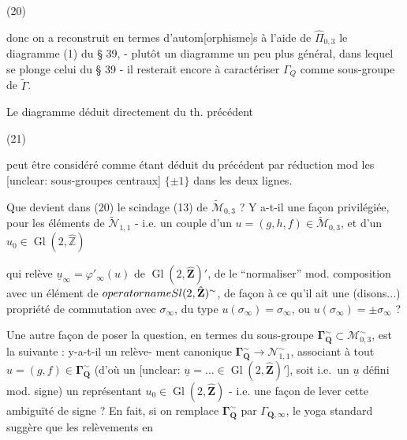 \begin{enumerate}
(20)

\newpage


donc on a reconstruit en termes d'autom[orphisme]s
à l'aide de $\hat{\Pi}_{0,3}$ le diagramme (1) du
§ 39, - plutôt un diagramme un
peu plus général, dans lequel se plonge
celui du § 39 - il resterait encore à
caractériser $\Gamma_Q$ comme sous-groupe de $\tilde{\Gamma}$.

Le diagramme déduit directement du
th. précédent

(21)

peut être considéré comme étant déduit
du précédent par réduction mod les
[unclear: sous-groupes centraux] $\{\pm 1\}$ dans les deux lignes.

Que devient dans (20) le scindage
(13) de $\tilde{\mathcal{M}}_{0,3}$ ? Y a-t-il une façon
privilégiée, pour les éléments de
$\tilde{\mathcal{N}}_{1,1}$ - i.e. un couple d'un
$u = (g,h,f) \in \tilde{\mathcal{M}}_{0,3}$, et d'un $u_0 \in \operatorname{Gl}(2,\hat{\mathbb{Z}})$

\newpage


qui relève $\underline{u}_\infty = \varphi'_\infty(u)$ de $\operatorname{Gl}(2,\hat{\mathbf{Z}})'$,
de le ``normaliser'' mod. composition
avec un élément de $\\operatorname{Sl}(2,\hat{\mathbf{Z}})^\sim$, de
façon à ce qu'il ait une (disons...)
propriété de commutation avec $\sigma_\infty$, du
type $u(\sigma_\infty) = \sigma_\infty$, ou $u(\sigma_\infty) = \pm \sigma_\infty$ ?

Une autre façon de poser la question,
en termes du sous-groupe $\boldsymbol{\Gamma}^\sim_{\mathbf{Q}} \subset \mathcal{M}_{0,3}^\sim$,
est la suivante : y-a-t-il un relève-
ment canonique $\boldsymbol{\Gamma}^\sim_{\mathbf{Q}} \to \mathcal{N}_{1,1}^\sim$,
associant à tout $u = (g,f) \in \boldsymbol{\Gamma}^\sim_{\mathbf{Q}}$
(d'où un [unclear: $\underline{u} = \dots \in \operatorname{Gl}(2,\hat{\mathbf{Z}})'$],
soit i.e.\ un $\underline{u}$ défini mod. signe)
un représentant $u_0 \in \operatorname{Gl}(2,\hat{\mathbf{Z}})$ - i.e.
une façon de lever cette ambiguïté
de signe ? En fait, si on remplace
$\boldsymbol{\Gamma}^\sim_{\mathbf{Q}}$ par $\Gamma_{\mathbf{Q}, \infty}$, le yoga
standard suggère que les relèvements en


\end{enumerate}
